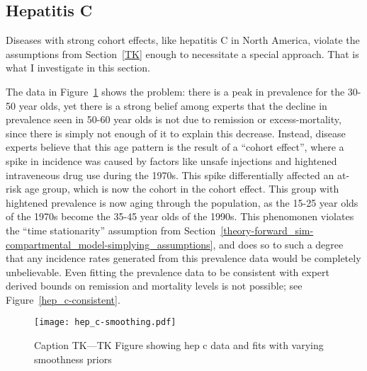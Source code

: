 \subsection{Hepatitis C}
Diseases with strong cohort effects, like hepatitis C in North America,
violate the assumptions from Section~\ref{TK} enough to
necessitate a special approach.  That is what I investigate in this
section.

The data in Figure~\ref{hep_c-data} shows the problem: there is a peak
in prevalence for the 30-50 year olds, yet there is a strong belief
among experts that the decline in prevalence seen in 50-60 year olds
is not due to remission or excess-mortality, since there is simply not
enough of it to explain this decrease.  Instead, disease experts
believe that this age pattern is the result of a ``cohort effect'',
where a spike in incidence was caused by factors like unsafe
injections and hightened intraveneous drug use during the 1970s.  This
spike differentially affected an at-risk age group, which is now the
cohort in the cohort effect.  This group with hightened prevalence is
now aging through the population, as the 15-25 year olds of the 1970s
become the 35-45 year olds of the 1990s.  This phenomonen violates the
``time stationarity'' assumption from
Section~\ref{theory-forward_sim-compartmental_model-simplying_assumptions},
and does so to such a degree that any incidence rates generated from
this prevalence data would be completely unbelievable.  Even fitting
the prevalence data to be consistent with expert derived bounds on
remission and mortality levels is not possible; see
Figure~\ref{hep_c-consistent}.
\begin{figure}
\begin{center}
\texttt{[image: hep\_c-smoothing.pdf]}
\end{center}
\caption{Caption TK---TK Figure showing hep c data and fits with varying smoothness priors}
\label{hep_c-data}
\end{figure}

